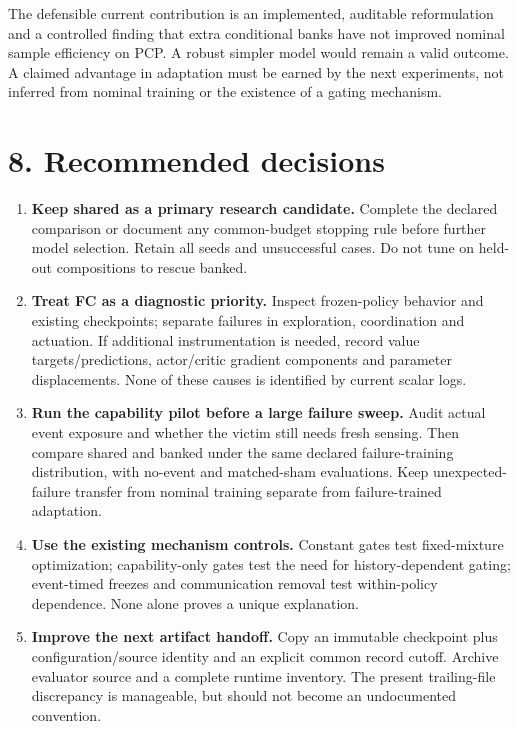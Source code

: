 \documentclass[
  10pt,
]{article}
\providecommand{\tightlist}{%
  \setlength{\itemsep}{0pt}\setlength{\parskip}{0pt}}
\begin{document}
The defensible current contribution is an implemented, auditable
reformulation and a controlled finding that extra conditional banks have
not improved nominal sample efficiency on PCP. A robust simpler model
would remain a valid outcome. A claimed advantage in adaptation must be
earned by the next experiments, not inferred from nominal training or
the existence of a gating mechanism.

\section{8. Recommended decisions}\label{recommended-decisions}

\begin{enumerate}
\def\labelenumi{\arabic{enumi}.}
\tightlist
\item
  \textbf{Keep shared as a primary research candidate.} Complete the
  declared comparison or document any common-budget stopping rule before
  further model selection. Retain all seeds and unsuccessful cases. Do
  not tune on held-out compositions to rescue banked.
\item
  \textbf{Treat FC as a diagnostic priority.} Inspect frozen-policy
  behavior and existing checkpoints; separate failures in exploration,
  coordination and actuation. If additional instrumentation is needed,
  record value targets/predictions, actor/critic gradient components and
  parameter displacements. None of these causes is identified by current
  scalar logs.
\item
  \textbf{Run the capability pilot before a large failure sweep.} Audit
  actual event exposure and whether the victim still needs fresh
  sensing. Then compare shared and banked under the same declared
  failure-training distribution, with no-event and matched-sham
  evaluations. Keep unexpected-failure transfer from nominal training
  separate from failure-trained adaptation.
\item
  \textbf{Use the existing mechanism controls.} Constant gates test
  fixed-mixture optimization; capability-only gates test the need for
  history-dependent gating; event-timed freezes and communication
  removal test within-policy dependence. None alone proves a unique
  explanation.
\item
  \textbf{Improve the next artifact handoff.} Copy an immutable
  checkpoint plus configuration/source identity and an explicit common
  record cutoff. Archive evaluator source and a complete runtime
  inventory. The present trailing-file discrepancy is manageable, but
  should not become an undocumented convention.
\end{enumerate}
\end{document}
